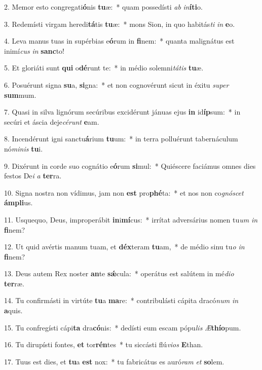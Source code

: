 2. Memor esto congregati\textbf{ó}nis \textbf{tu}æ:~*  quam possedísti \textit{ab} \textit{in}\textbf{í}\textbf{ti}o.\

3. Redemísti virgam heredi\textbf{tá}tis \textbf{tu}æ:~*  mons Sion, in quo habitás\textit{ti} \textit{in} \textbf{e}o.\

4. Leva manus tuas in supérbias e\textbf{ó}rum in \textbf{fi}nem:~*  quanta malignátus est inimí\textit{cus} \textit{in} \textbf{sanc}to!\

5. Et gloriáti sunt \textbf{qui} o\textbf{dé}runt te:~*  in médio solemni\textit{tá}\textit{tis} \textbf{tu}æ.\

6. Posuérunt signa \textbf{su}a, \textbf{si}gna:~*  et non cognovérunt sicut in éxitu \textit{su}\textit{per} \textbf{sum}mum.\

7. Quasi in silva lignórum secúribus excidérunt jánuas ejus \textbf{in} id\textbf{íp}sum:~*  in secúri et áscia deje\textit{cé}\textit{runt} \textbf{e}am.\

8. Incendérunt igni sanctu\textbf{á}rium \textbf{tu}um:~*  in terra polluérunt tabernáculum nó\textit{mi}\textit{nis} \textbf{tu}i.\

9. Dixérunt in corde suo cognátio e\textbf{ó}rum \textbf{si}mul:~*  Quiéscere faciámus omnes dies festos De\textit{i} \textit{a} \textbf{ter}ra.\

10. Signa nostra non vídimus, jam non \textbf{est} pro\textbf{phé}ta:~*  et nos non co\textit{gnó}\textit{scet} \textbf{ám}\textbf{pli}us.\

11. Usquequo, Deus, improperábit \textbf{in}i\textbf{mí}cus:~*  irrítat adversárius nomen tu\textit{um} \textit{in} \textbf{fi}nem?\

12. Ut quid avértis manum tuam, et \textbf{déx}teram \textbf{tu}am,~*  de médio sinu tu\textit{o} \textit{in} \textbf{fi}nem?\

13. Deus autem Rex noster \textbf{an}te \textbf{sǽ}cula:~*  operátus est salútem in mé\textit{di}\textit{o} \textbf{ter}ræ.\

14. Tu confirmásti in virtúte \textbf{tu}a \textbf{ma}re:~*  contribulásti cápita dracó\textit{num} \textit{in} \textbf{a}quis.\

15. Tu confregísti cápi\textbf{ta} dra\textbf{có}nis:~*  dedísti eum escam pópu\textit{lis} \textit{Æ}\textbf{thí}\textbf{o}pum.\

16. Tu dirupísti fontes, \textbf{et} tor\textbf{rén}tes~*  tu siccásti flú\textit{vi}\textit{os} \textbf{E}than.\

17. Tuus est dies, et \textbf{tu}a \textbf{est} nox:~*  tu fabricátus es auró\textit{ram} \textit{et} \textbf{so}lem.\

